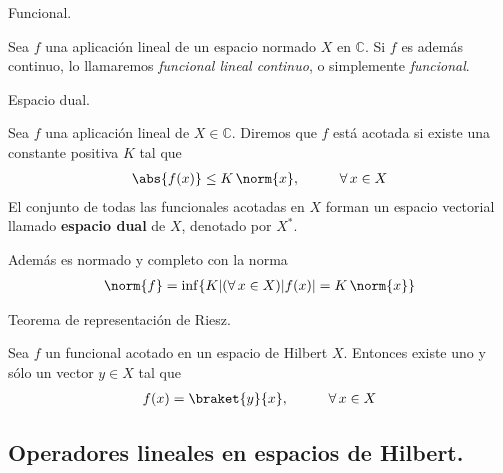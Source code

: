 \begin{defi} Funcional.

Sea $f$ una aplicación lineal de un espacio normado $X$ en $\mathbb{C}$. Si $f$ es además continuo, lo llamaremos \textit{funcional lineal continuo}, o simplemente \textit{funcional}.
\end{defi}
\begin{defi} Espacio dual.

Sea $f$ una aplicación lineal de $X \in \mathbb{C}$. Diremos que $f$ está acotada si existe una constante positiva $K$ tal que
\begin{align*} \abs{f(x)} \leq K \, \norm{x}, \hspace{1cm} \forall \, x \in X \end{align*}
El conjunto de todas las funcionales acotadas en $X$ forman un espacio vectorial llamado \textbf{espacio dual} de $X$, denotado por $X^{*}$.

Además es normado y completo con la norma
\begin{align*} \norm{f} = \inf \{ K \vert (\forall \, x \in X) \vert f(x) \vert = K \, \norm{x} \} \end{align*}
\end{defi}
\begin{teo} Teorema de representación de Riesz.

Sea $f$ un funcional acotado en un espacio de Hilbert $X$. Entonces existe uno y sólo un vector $y \in X$ tal que
\begin{align*} f(x) = \braket{y}{x}, \hspace{1cm} \forall \, x \in X \end{align*}
\end{teo}

\subsection{Operadores lineales en espacios de Hilbert.}

